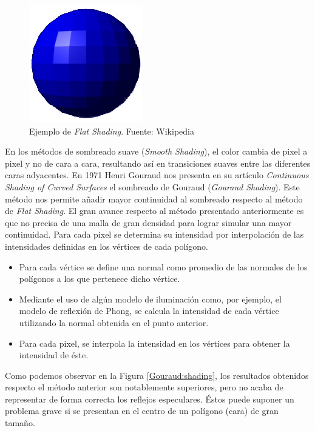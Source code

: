 \documentclass[titlepage,12pt]{report}
\begin{document}
\begin{figure}[ht]
	\centering
	\includegraphics[scale=0.5]{media/Flat-shading-sample.png}
	\caption{Ejemplo de \textit{Flat Shading}. Fuente: Wikipedia}
	\label{flat:shading}
\end{figure}

En los métodos de sombreado suave (\textit{Smooth Shading}), el color cambia de pixel a pixel y no de cara a cara, resultando así en transiciones suaves entre las diferentes caras adyacentes.
En 1971 Henri Gouraud nos presenta en su artículo \textit{Continuous Shading of Curved Surfaces} \cite{Henri1971} el sombreado de Gouraud (\textit{Gouraud Shading}). Este método nos permite añadir mayor continuidad al sombreado respecto al método de \textit{Flat Shading}. El gran avance respecto al método presentado anteriormente es que no precisa de una malla de gran densidad para lograr simular una mayor continuidad. Para cada pixel se determina su intensidad por interpolación de las intensidades definidas en los vértices de cada polígono.

\begin{itemize}
	\item Para cada vértice se define una normal como promedio de las normales de los polígonos a los que pertenece dicho vértice.
	\item Mediante el uso de algún modelo de iluminación como, por ejemplo, el modelo de reflexión de Phong, se calcula la intensidad de cada vértice utilizando la normal obtenida en el punto anterior.
	\item Para cada pixel, se interpola la intensidad en los vértices para obtener la intensidad de éste.
\end{itemize} 

Como podemos observar en la Figura \ref{Gouraud:shading}, los resultados obtenidos respecto el método anterior son notablemente superiores, pero no acaba de representar de forma correcta los reflejos especulares. Éstos puede suponer un problema grave si se presentan en el centro de un polígono (cara) de gran tamaño.
\end{document}

